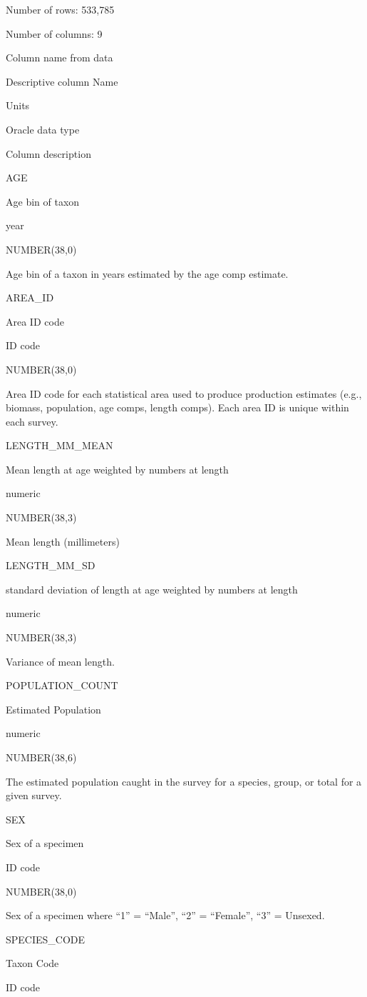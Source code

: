 \documentclass[
  letterpaper,
  oneside,
  open=any]{scrbook}
\begin{document}
Number of rows: 533,785

Number of columns: 9

Column name from data

Descriptive column Name

Units

Oracle data type

Column description

AGE

Age bin of taxon

year

NUMBER(38,0)

Age bin of a taxon in years estimated by the age comp estimate.

AREA\_ID

Area ID code

ID code

NUMBER(38,0)

Area ID code for each statistical area used to produce production
estimates (e.g., biomass, population, age comps, length comps). Each
area ID is unique within each survey.

LENGTH\_MM\_MEAN

Mean length at age weighted by numbers at length

numeric

NUMBER(38,3)

Mean length (millimeters)

LENGTH\_MM\_SD

standard deviation of length at age weighted by numbers at length

numeric

NUMBER(38,3)

Variance of mean length.

POPULATION\_COUNT

Estimated Population

numeric

NUMBER(38,6)

The estimated population caught in the survey for a species, group, or
total for a given survey.

SEX

Sex of a specimen

ID code

NUMBER(38,0)

Sex of a specimen where ``1'' = ``Male'', ``2'' = ``Female'', ``3'' =
Unsexed.

SPECIES\_CODE

Taxon Code

ID code
\end{document}
